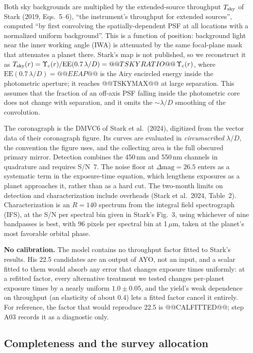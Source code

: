 \documentclass[11pt,a4paper]{article}
\begin{document}
Both sky backgrounds are multiplied by the extended-source throughput $T_{\rm sky}$ of Stark
(2019, Eqs.~5--6), ``the instrument's throughput for extended sources'', computed ``by first
convolving the spatially-dependent PSF at all locations with a normalized uniform background''.
This is a function of position: background light near the inner working angle (IWA) is attenuated
by the same focal-plane mask that attenuates a planet there. Stark's map is not published, so we
reconstruct it as $T_{\rm sky}(r) = \Upsilon_{\rm c}(r)/\mathrm{EE}(0.7\,\lambda/D)
= @@TSKYRATIO@@\,\Upsilon_{\rm c}(r)$, where $\mathrm{EE}(0.7\,\lambda/D) = @@EEAP@@$ is the Airy
encircled energy inside the photometric aperture; it reaches @@TSKYMAX@@ at large separation. This
assumes that the fraction of an
off-axis PSF falling inside the photometric core does not change with separation, and it omits the
$\sim\lambda/D$ smoothing of the convolution.

The coronagraph is the DMVC6 of Stark et al.\ (2024), digitized from the vector data of their
coronagraph figure. Its curves are evaluated in \emph{circumscribed} $\lambda/D$, the convention
the figure uses, and the collecting area is the full obscured primary mirror. Detection combines
the 450\,nm and 550\,nm channels in quadrature and requires S/N~7. The noise floor at
$\Delta\mathrm{mag} = 26.5$ enters as a systematic term in the exposure-time equation, which
lengthens exposures as a planet approaches it, rather than as a hard cut. The two-month limits on
detection and characterization include overheads (Stark et al.\ 2024, Table~2). Characterization
is an $R = 140$ spectrum from the integral field spectrograph (IFS), at the S/N per spectral bin
given in Stark's Fig.~3, using whichever of nine bandpasses is best, with 96 pixels per spectral
bin at 1\,$\mu$m, taken at the planet's most favorable orbital phase.

\textbf{No calibration.} The model contains no throughput factor fitted to Stark's results. His
22.5 candidates are an output of AYO, not an input, and a scalar fitted to them would absorb any
error that changes exposure times uniformly: at a refitted factor, every alternative treatment we
tested changes per-planet exposure times by a nearly uniform $1.0 \pm 0.05$, and the yield's weak
dependence on throughput (an elasticity of about 0.4) lets a fitted factor cancel it entirely. For
reference, the factor that would reproduce 22.5 is @@CALFITTED@@; step A03 records it as a
diagnostic only.

\subsection{Completeness and the survey allocation}
\end{document}
